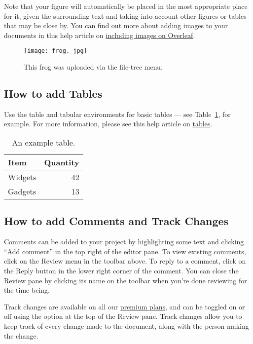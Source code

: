 \documentclass{article}
\begin{document}
Note that your figure will automatically be placed in the most appropriate place for it,
given the surrounding text and taking into account other figures or tables that may be close by.
You can find out more about adding images to your documents in this help article on \href{https://www.
overleaf.
com/learn/how-to/Including_images_on_Overleaf}{including images on Overleaf}.

\begin{figure}
  \centering
  \texttt{[image: frog.
  jpg]}
  \caption{\label{fig:frog}This frog was uploaded via the file-tree menu.
  }
\end{figure}

\subsection{How to add Tables}

Use the table and tabular environments for basic tables --- see Table~\ref{tab:widgets},
for example.
For more information,
please see this help article on \href{https://www.
overleaf.
com/learn/latex/tables}{tables}.


\begin{table}
  \centering
  \begin{tabular}{l|r}
  Item & Quantity \\\hline
  Widgets & 42 \\
  Gadgets & 13
\end{tabular}
\caption{\label{tab:widgets}An example table.
}
\end{table}

\subsection{How to add Comments and Track Changes}

Comments can be added to your project by highlighting some text and clicking ``Add comment'' in the top right of the editor pane.
To view existing comments,
click on the Review menu in the toolbar above.
To reply to a comment,
click on the Reply button in the lower right corner of the comment.
You can close the Review pane by clicking its name on the toolbar when you're done reviewing for the time being.

Track changes are available on all our \href{https://www.
overleaf.
com/user/subscription/plans}{premium plans},
and can be toggled on or off using the option at the top of the Review pane.
Track changes allow you to keep track of every change made to the document,
along with the person making the change.
\end{document}
